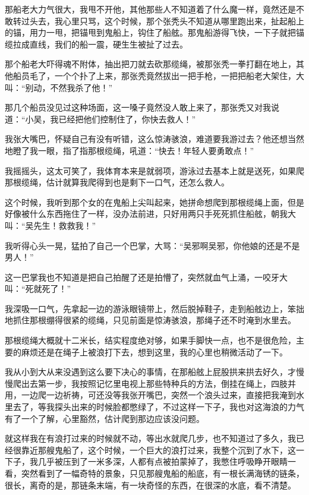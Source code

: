 那船老大力气很大，我甩不开他，其他那些人不知道着了什么魔一样，竟然还是不敢转过头去，我心里只骂，这个时候，那个张秃头不知道从哪里跑出来，扯起船上的锚，用力一甩，把锚甩到鬼船上，钩住了船舷。那鬼船游得飞快，一下子就把锚缆拉成直线，我们的船一震，硬生生被扯了过去。

那个船老大吓得魂不附体，抽出把刀就去砍那缆绳，被那张秃一拳打翻在地上，其他船员毛了，一个个扑了上来，那张秃竟然拔出一把手枪，一把把船老大架住，大叫：“别动，不然我杀了他！”

那几个船员没见过这种场面，这一嗓子竟然没人敢上来了，那张秃又对我说道：“小吴，我已经把他们控制住了，你快去救人！”

我张大嘴巴，怀疑自己有没有听错，这么惊涛骇浪，难道要我游过去？他还想当然地瞪了我一眼，指了指那根缆绳，吼道：“快去！年轻人要勇敢点！”

我摇摇头，这太可笑了，我体育本来是就弱项，游泳过去基本上就是送死，如果爬那根缆绳，估计就算我爬得到也是剩下一口气，还怎么救人。

这个时候，我听到那个女的在鬼船上尖叫起来，她拼命想爬到那根缆绳上面，但是好像被什么东西拖住了一样，没办法前进，只好用两只手死死抓住船舷，朝我大叫：“吴先生！救救我！”

我听得心头一晃，猛拍了自己一个巴掌，大骂：“吴邪啊吴邪，你他娘的还是不是男人！”

这一巴掌我也不知道是把自己拍醒了还是拍懵了，突然就血气上涌，一咬牙大叫：“死就死了！”

我深吸一口气，先拿起一边的游泳眼镜带上，然后脱掉鞋子，走到船舷边上，笨拙地抓住那根绷得很紧的缆绳，只见前面是惊涛骇浪，那绳子还不时淹到水里去。

那根缆绳大概就十二米长，结实程度绝对够，如果手脚快一点，也不是很危险，主要的麻烦还是在绳子上被浪打下去，想到这里，我的心里也稍微活动了一下。

我从小到大从来没遇到这么要下决心的事情，在那船舷上屁股拱来拱去好久，才慢慢爬出去第一步，我按照记忆里电视上那些特种兵的方法，倒挂在绳上，四肢并用，一边爬一边祈祷，可还没等我张开嘴巴，突然一个浪头过来，直接把我淹到水里去了，等我探头出来的时候脸都憋绿了，不过这样一下子，我也对这海浪的力气有了一个了解，心里豁然，估计爬到那边应该没问题。

就这样我在有浪打过来的时候就不动，等出水就爬几步，也不知道过了多久，我已经很靠近那艘鬼船了，这个时候，一个巨大的浪打过来，我整个沉到了水下，这一下子，我几乎被压到了一米多深，人都有点被拍蒙掉了，我憋住呼吸睁开眼睛一看，突然看到了一幅奇特的景象，只见那艘鬼船的船底，有一根长满海锈的链条，很长，离奇的是，那链条末端，有一块奇怪的东西，在很深的水底，看不清楚。

